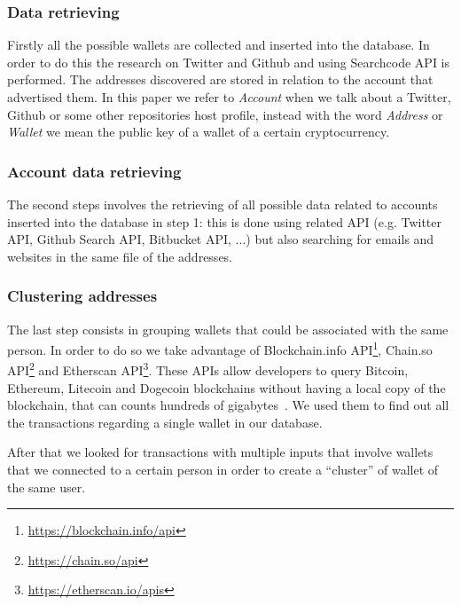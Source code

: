 \subsubsection*{Data retrieving} Firstly all the possible wallets are collected
and inserted into the database. In order to do this the research on
Twitter and Github and using Searchcode API is performed. The addresses
discovered are stored in relation to the account that advertised them.
In this paper we refer to \textit{Account} when we talk about a Twitter, Github
or some other repositories host profile, instead with the word \textit{Address}
or \textit{Wallet} we mean the public key of a wallet of a certain
cryptocurrency.
\subsubsection*{Account data retrieving} The second steps involves the
retrieving of all possible data related to accounts inserted into the database
in step 1: this is done using related API (e.g. Twitter API, Github Search API,
Bitbucket API, ...) but also searching for emails and websites in the same file
of the addresses.
\subsubsection*{Clustering addresses} The last step consists in grouping 
wallets that could be associated with the same person. In order to do so we
take advantage of
Blockchain.info API\footnote{\url{https://blockchain.info/api}},
Chain.so API\footnote{\url{https://chain.so/api}} and
Etherscan API\footnote{\url{https://etherscan.io/apis}}. These APIs allow
developers to query Bitcoin, Ethereum, Litecoin and Dogecoin blockchains without
having a local copy of the blockchain, that can counts hundreds of
gigabytes~\cite{bib:bitinfochart}. We used them to find out all the transactions
regarding a single wallet in our database. 

After that we looked for transactions with multiple inputs that
involve wallets that we connected to a certain person in order to create a
``cluster'' of wallet of the same user.
